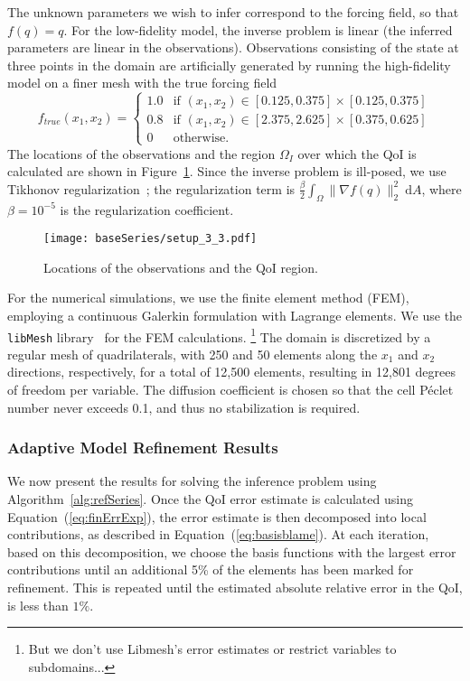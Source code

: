The unknown parameters we wish to infer correspond to the forcing field, so that $f(q)=q$. For the low-fidelity model, the inverse problem is linear (the inferred parameters are linear in the observations). Observations consisting of the state at three points in the domain are artificially generated by running the high-fidelity model on a finer mesh with the true forcing field
%
\begin{equation}
f_{true}(x_1,x_2)=
\begin{cases}
1.0 & \textrm{if }(x_1,x_2)\in[0.125,0.375]\times[0.125,0.375] \\
0.8 & \textrm{if }(x_1,x_2)\in[2.375,2.625]\times[0.375,0.625] \\
0 & \textrm{otherwise}.
\end{cases}
\end{equation}
%
The locations of the observations and the region $\Omega_I$ over which the QoI is calculated are shown in Figure~\ref{fig:baseSetup}. Since the inverse problem is ill-posed, we use Tikhonov regularization~\cite{EngHanNeu00}; the regularization term is $\frac{\beta}{2}\int_\Omega \|\nabla f(q)\|_2^2\:\textrm{d}A$, where $\beta=10^{-5}$ is the regularization coefficient. 
%
\begin{figure}[h]
\centering
\texttt{[image: baseSeries/setup\_3\_3.pdf]}
\caption{Locations of the observations and the QoI region.}
\label{fig:baseSetup}
\end{figure}
%

For the numerical simulations, we use the finite element method (FEM), employing a continuous Galerkin formulation with Lagrange elements. We use the \texttt{libMesh} library~\cite{libMeshPaper} for the FEM calculations. \footnote{But we don't use Libmesh's error estimates or restrict variables to subdomains...} The domain is discretized by a regular mesh of quadrilaterals, with 250 and 50 elements along the $x_1$ and $x_2$ directions, respectively, for a total of 12,500 elements, resulting in 12,801 degrees of freedom per variable. The diffusion coefficient is chosen so that the cell P\'{e}clet number never exceeds 0.1, and thus no stabilization is required.
%
\subsubsection{Adaptive Model Refinement Results} \label{sec:cdvcdrBaseRef} 
%
We now present the results for solving the inference problem using Algorithm~\ref{alg:refSeries}. Once the QoI error estimate is calculated using Equation~(\ref{eq:finErrExp}), the error estimate is then decomposed into local contributions, as described in Equation~(\ref{eq:basisblame}). At each iteration, based on this decomposition, we choose the basis functions with the largest error contributions until an additional 5\% of the elements has been marked for refinement. This is repeated until the estimated absolute relative error in the QoI, is less than $1\%$.

